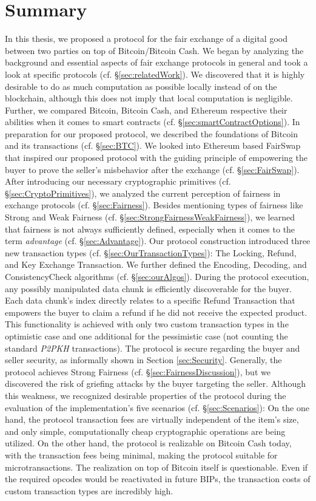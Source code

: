 \documentclass{cacthesis}
\newcounter{protocol}
\begin{document}
	\section{Summary}
    In this thesis, we proposed a protocol for the fair exchange of a digital good between two parties on top of Bitcoin/Bitcoin Cash. We began by analyzing the background and essential aspects of fair exchange protocols in general and took a look at specific protocols (cf. §\ref{sec:relatedWork}). We discovered that it is highly desirable to do as much computation as possible locally instead of on the blockchain, although this does not imply that local computation is negligible. Further, we compared Bitcoin, Bitcoin Cash, and Ethereum respective their abilities when it comes to smart contracts (cf. §\ref{sec:smartContractOptions}). In preparation for our proposed protocol, we described the foundations of Bitcoin and its transactions (cf. §\ref{sec:BTC}). We looked into Ethereum based FairSwap that inspired our proposed protocol with the guiding principle of empowering the buyer to prove the seller's misbehavior after the exchange (cf. §\ref{sec:FairSwap}). After introducing our necessary cryptographic primitives (cf. §\ref{sec:CryptoPrimitives}), we analyzed the current perception of fairness in exchange protocols (cf. §\ref{sec:Fairness}). Besides mentioning types of fairness like Strong and Weak Fairness (cf. §\ref{sec:StrongFairnessWeakFairness}), we learned that fairness is not always sufficiently defined, especially when it comes to the term \textit{advantage} (cf. §\ref{sec:Advantage}). Our protocol construction introduced three new transaction types (cf. §\ref{sec:OurTransactionTypes}): The Locking, Refund, and Key Exchange Transaction. We further defined the \textsf{Encoding}, \textsf{Decoding}, and \textsf{ConsistencyCheck} algorithms (cf. §\ref{sec:ourAlgos}). During the protocol execution, any possibly manipulated data chunk is efficiently discoverable for the buyer. Each data chunk's index directly relates to a specific Refund Transaction that empowers the buyer to claim a refund if he did not receive the expected product. This functionality is achieved with only two custom transaction types in the optimistic case and one additional for the pessimistic case (not counting the standard \textit{P2PKH} transactions). The protocol is secure regarding the buyer and seller security, as informally shown in Section \ref{sec:Security}. Generally, the protocol achieves Strong Fairness (cf. §\ref{sec:FairnessDiscussion}), but we discovered the risk of griefing attacks by the buyer targeting the seller.  Although this weakness, we recognized desirable properties of the protocol during the evaluation of the implementation's five scenarios (cf. §\ref{sec:Scenarios}): On the one hand, the protocol transaction fees are virtually independent of the item's size, and only simple, computationally cheap cryptographic operations are being utilized. On the other hand, the protocol is realizable on Bitcoin Cash today, with the transaction fees being minimal, making the protocol suitable for microtransactions. The realization on top of Bitcoin itself is questionable. Even if the required opcodes would be reactivated in future BIPs, the transaction costs of custom transaction types are incredibly high.  
\end{document}
